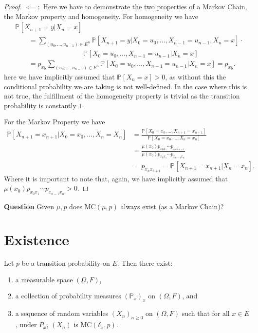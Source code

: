 \begin{proof}
{$\impliedby:$ Here we have to demonstrate the two properties of a Markov Chain, the Markov property and homogeneity. For homogeneity we have
\begin{align}
&	\mathbb{P}_{} \left[ X_{n+1} = y | X_n =x \right] \\
&\qquad = \sum_{(u_0, \ldots ,u_{n-1}) \in E^n}^{} \mathbb{P}_{} \left[ X_{n+1}=y | X_0=u_0, \ldots ,X_{n-1}=u_{n-1}, X_n =x \right] \cdot \\
& \qquad \qquad \qquad \qquad \qquad  \mathbb{P}_{} \left[ X_0=u_0, \ldots , X_{n-1}=u_{n-1} | X_n = x \right] \\
&\qquad = p_{xy} \sum_{(u_0, \ldots ,u_{n-1})\in E^n}^{} \mathbb{P}_{} \left[ X_0=u_0, \ldots ,X_{n-1}=u_{n-1} | X_n = x \right] = p_{xy}
.\end{align}
here we have implicitly assumed that $\mathbb{P}_{} \left[ X_n = x \right] > 0$, as without this the conditional probability we are taking is not well-defined. In the case where this is not true, the fulfillment of the homogeneity property is trivial as the transition probability is constantly $1$.

For the Markov Property we have
\begin{align}
	\mathbb{P}_{} \left[ X_{n+1} = x_{n+1} | X_0 =x_0, \ldots ,X_n=X_n \right] &=
		\frac{\mathbb{P}_{} \left[ X_0=x_0, \ldots , X_{n+1}=x_{n+1} \right] }
		{\mathbb{P}_{} \left[ X_0=x_0 , \ldots , X_{n}=x_{n} \right]} \\
	&= \frac{\mu(x_0)p_{x_0 x_1}  \cdots  p_{x_{n}x_{n+1}}} {\mu(x_0)p_{x_0x_1} \cdots p_{x_{n-1}x_{n}}} \\
	&= p_{x_n x_{n+1}} = \mathbb{P}_{} \left[ X_{n+1} = x_{n+1} | X_n=x_n \right] 
.\end{align}
Where it is important to note that, again,  we have implicitly assumed that \newline $\mu(x_0)p_{x_0x_1} \cdots p_{x_{n-1}x_n}>0$. 
}
\end{proof}


\textbf{Question} Given $\mu, p$ does $ \textrm{MC}(\mu, p)$ always exist (as a Markov Chain)?

\section{Existence}

\begin{theorem}
	Let $p$ be a transition probability on $E$. Then there exist:
\begin{enumerate}
	\item a measurable space $(\Omega, F)$,
	\item a collection of probability measures $(\mathbb{P}_x)_{x}$ on $(\Omega, F)$, and
	\item a sequence of random variables $(X_n)_{n \geq 0}$ on $(\Omega, F)$ such that for all $x\in E$, under $P_x$, $(X_n)$ is  $ \textrm{MC}(\delta_x, p)$.
\end{enumerate}

\end{theorem}

